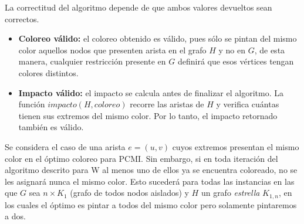 La correctitud del algoritmo depende de que ambos valores devueltos sean correctos.

\begin{itemize}
    \item \textbf{Coloreo válido:} el coloreo obtenido es válido, pues sólo se pintan del mismo color aquellos nodos que presenten arista en el grafo $H$ y no en $G$, de esta manera, cualquier restricción presente en $G$ definirá que esos vértices tengan colores distintos.
    \item \textbf{Impacto válido:} el impacto se calcula antes de finalizar el algoritmo. La función $impacto(H, coloreo)$ recorre las aristas de $H$ y verifica cuántas tienen sus extremos del mismo color. Por lo tanto, el impacto retornado también es válido.
\end{itemize}


Se considera el caso de una arista $e=(u,v)$ cuyos extremos presentan el mismo color en el óptimo coloreo para PCMI. Sin embargo, si en toda iteración del algoritmo descrito para W al menos uno de ellos ya se encuentra coloreado, no se les asignará nunca el mismo color. Esto sucederá para todas las instancias en las que $G$ sea $n \times K_1$ (grafo de todos nodos aislados) y $H$ un grafo \textit{estrella} $K_{1, n}$, en los cuales el óptimo es pintar a todos del mismo color pero solamente pintaremos a dos.


